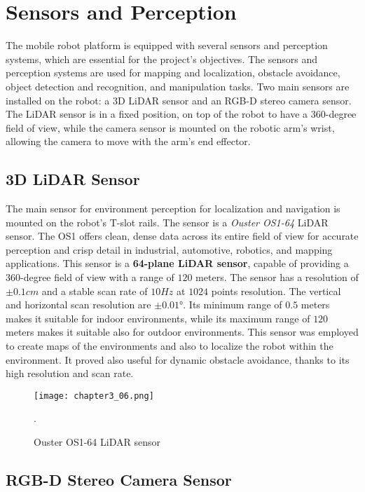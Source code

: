 \section{Sensors and Perception}

The mobile robot platform is equipped with several sensors and perception systems, which are essential for the project's
objectives. The sensors and perception systems are used for mapping and localization, obstacle avoidance, object detection
and recognition, and manipulation tasks. 
Two main sensors are installed on the robot: a 3D LiDAR sensor and an RGB-D stereo camera sensor.
The LiDAR sensor is in a fixed position, on top of the robot to have a 360-degree field of view, while the camera sensor
is mounted on the robotic arm's wrist, allowing the camera to move with the arm's end effector.

\subsection{3D LiDAR Sensor}

The main sensor for environment perception for localization and navigation is mounted on the robot's T-slot rails.
The sensor is a \textit{Ouster OS1-64} LiDAR sensor.
The OS1 offers clean, dense data across its entire field of view for accurate perception and crisp detail in industrial,
automotive, robotics, and mapping applications.
This sensor is a \textbf{64-plane LiDAR sensor}, capable of providing a 360-degree field of view with a range of $120$ meters. 
The sensor has a resolution of $\pm 0.1cm$ and a stable scan rate of $10 Hz$ at $1024$ points resolution.
The vertical and horizontal scan resolution are $\pm 0.01$°.
Its minimum range of $0.5$ meters makes it suitable for indoor environments, while its maximum range of $120$ meters
makes it suitable also for outdoor environments.
This sensor was employed to create maps of the environments and also to localize the robot within the environment.
It proved also useful for dynamic obstacle avoidance, thanks to its high resolution and scan rate.

\begin{figure}[t]
    \centering
    \texttt{[image: chapter3\_06.png]}
    \captionsetup{width=1\linewidth}
    \caption{Ouster OS1-64 LiDAR sensor}.
    \label{fig:c3_img06}
\end{figure}

\subsection{RGB-D Stereo Camera Sensor}

